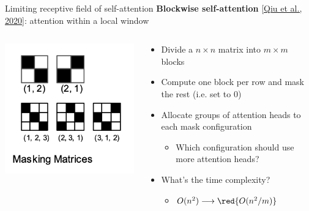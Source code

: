 \documentclass[usenames,dvipsnames,notes,11pt,aspectratio=169,hyperref={colorlinks=true, linkcolor=blue}]{beamer}
\begin{document}
\begin{frame}
    {Limiting receptive field of self-attention}
    \textbf{Blockwise self-attention} \href{https://arxiv.org/pdf/1911.02972.pdf}{[Qiu et al., 2020]}: attention within a local window \\[1em]

    \begin{columns}
        \begin{column}{0.4\textwidth}
        {\includegraphics[width=\textwidth]{figures/block-transformer}}
        \end{column}
        \begin{column}{0.6\textwidth}
            \begin{itemize}
                \item Divide a $n\times n$ matrix into $m\times m$ blocks
                \item Compute one block per row and mask the rest (i.e. set to 0)
                \item Allocate groups of attention heads to each mask configuration
                    \begin{itemize}
                        \item Which configuration should use more attention heads?
                    \end{itemize}
                \pause
                \item What's the time complexity?\pause
                    \begin{itemize}
                        \item $O(n^2) \longrightarrow \red{O(n^2/m)}$ 
                    \end{itemize}

            \end{itemize}
        \end{column}
    \end{columns}
\end{frame}
\end{document}
